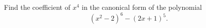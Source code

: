 Find the coefficient of $x^{4}$ in the canonical form of the polynomial \[(x^{2}-2)^{6}-(2x+1)^{5}.\]
